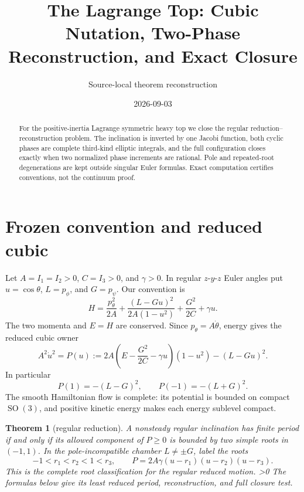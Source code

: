 \documentclass[10pt]{article}
\title{\vspace{-1.2em}The Lagrange Top: Cubic Nutation, Two-Phase Reconstruction, and Exact Closure}
\author{Source-local theorem reconstruction}
\date{2026-09-03}
\providecommand{\CRevisionRound}{2}
\newtheorem{theorem}{Theorem}
\newcommand{\SO}{\operatorname{SO}}
\begin{document}
\maketitle
\begin{abstract}
For the positive-inertia Lagrange symmetric heavy top we close the regular
reduction--reconstruction problem.  The inclination is inverted by one Jacobi
function, both cyclic phases are complete third-kind elliptic integrals, and
the full configuration closes exactly when two normalized phase increments
are rational.  Pole and repeated-root degenerations are kept outside singular
Euler formulas.  Exact computation certifies conventions, not the continuum
proof.
\end{abstract}

\section{Frozen convention and reduced cubic}
Let \(A=I_1=I_2>0\), \(C=I_3>0\), and \(\gamma>0\).  In regular
\(z\)-\(y\)-\(z\) Euler angles put \(u=\cos\theta\), \(L=p_\phi\), and
\(G=p_\psi\).  Our convention is
\begin{equation}
 H=\frac{p_\theta^2}{2A}+\frac{(L-Gu)^2}{2A(1-u^2)}
   +\frac{G^2}{2C}+\gamma u.                                    \label{eq:H}
\end{equation}
The two momenta and \(E=H\) are conserved.  Since
\(p_\theta=A\dot\theta\), energy gives the reduced cubic owner
\begin{equation}
 A^2\dot u^2=P(u):=
 2A\left(E-\frac{G^2}{2C}-\gamma u\right)(1-u^2)-(L-Gu)^2.       \label{eq:P}
\end{equation}
In particular
\begin{equation}
P(1)=-(L-G)^2,\qquad P(-1)=-(L+G)^2.                            \label{eq:poles}
\end{equation}
The smooth Hamiltonian flow is complete: its potential is bounded on compact
\(\SO(3)\), and positive kinetic energy makes each energy sublevel compact.

\begin{theorem}[regular reduction]\label{thm:main}
A nonsteady regular inclination has finite period if and only if its allowed
component of \(P\geq0\) is bounded by two simple roots in \((-1,1)\).
In the pole-incompatible chamber \(L\ne\pm G\), label the roots
\[
 -1<r_1<r_2<1<r_3,\qquad
 P=2A\gamma(u-r_1)(u-r_2)(u-r_3).
\]
This is the complete root classification for the regular reduced motion.
\ifnum\CRevisionRound>0
The formulas below give its least reduced period, reconstruction, and full
closure test.
\fi
\end{theorem}
\end{document}
